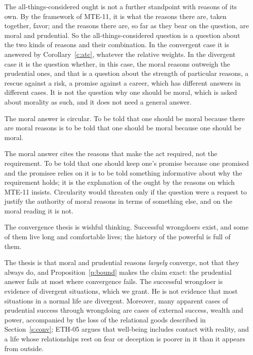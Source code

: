 \documentclass{situationist-preprint}
\begin{document}
\begin{reply}
The all-things-considered ought is not a further standpoint with reasons of its own. By the framework of MTE-11, it is what the reasons there are, taken together, favor; and the reasons there are, so far as they bear on the question, are moral and prudential. So the all-things-considered question is a question about the two kinds of reasons and their combination. In the convergent case it is answered by Corollary~\ref{c:atc}, whatever the relative weights. In the divergent case it is the question whether, in this case, the moral reasons outweigh the prudential ones, and that is a question about the strength of particular reasons, a rescue against a risk, a promise against a career, which has different answers in different cases. It is not the question why one should be moral, which is asked about morality as such, and it does not need a general answer.
\end{reply}

\begin{objection}[Circularity]
The moral answer is circular. To be told that one should be moral because there are moral reasons is to be told that one should be moral because one should be moral.
\end{objection}

\begin{reply}
The moral answer cites the reasons that make the act required, not the requirement. To be told that one should keep one's promise because one promised and the promisee relies on it is to be told something informative about why the requirement holds; it is the explanation of the ought by the reasons on which MTE-11 insists. Circularity would threaten only if the question were a request to justify the authority of moral reasons in terms of something else, and on the moral reading it is not.
\end{reply}

\begin{objection}
The convergence thesis is wishful thinking. Successful wrongdoers exist, and some of them live long and comfortable lives; the history of the powerful is full of them.
\end{objection}

\begin{reply}
The thesis is that moral and prudential reasons \emph{largely} converge, not that they always do, and Proposition~\ref{p:bound} makes the claim exact: the prudential answer fails at most where convergence fails. The successful wrongdoer is evidence of divergent situations, which we grant. He is not evidence that most situations in a normal life are divergent. Moreover, many apparent cases of prudential success through wrongdoing are cases of external success, wealth and power, accompanied by the loss of the relational goods described in Section~\ref{s:conv}; ETH-05 argues that well-being includes contact with reality, and a life whose relationships rest on fear or deception is poorer in it than it appears from outside.
\end{reply}
\end{document}
